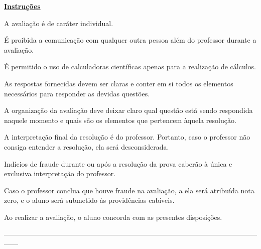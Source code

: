 \noindent\textbf{\large{\underline{Instruções}}}

{\small
\begin{itemize*}
	\item[\textbullet]{A avaliação é de caráter individual.}
	\item[\textbullet]{É proibida a comunicação com qualquer outra pessoa além do professor durante a avaliação.}
	\item[\textbullet]{É permitido o uso de calculadoras científicas apenas para a realização de cálculos.}
	\item[\textbullet]{As respostas fornecidas devem ser claras e conter em si todos os elementos necessários para responder as devidas questões.}
	\item[\textbullet]{A organização da avaliação deve deixar claro qual questão está sendo respondida naquele momento e quais são os elementos que pertencem àquela resolução.}
	\item[\textbullet]{A interpretação final da resolução é do professor. Portanto, caso o professor não consiga entender a resolução, ela será desconsiderada.}
	\item[\textbullet]{Indícios de fraude durante ou após a resolução da prova caberão à única e exclusiva interpretação do professor.}
	\item[\textbullet]{Caso o professor conclua que houve fraude na avaliação, a ela será atribuída nota zero, e o aluno será submetido às providências cabíveis.}
	\item[\textbullet]{Ao realizar a avaliação, o aluno concorda com as presentes disposições.}
\end{itemize*}
}
\begin{center}
	------------------------------------------------------------------------------------------------------------------
\end{center}